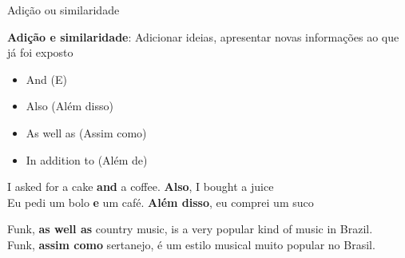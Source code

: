 \documentclass[compress,mathserif,xcolor=table]{beamer}
\begin{document}

\begin{frame}{Adição ou similaridade}

\textbf{Adição e similaridade}: Adicionar ideias, apresentar novas informações ao que já foi exposto

\vspace{0.25cm}

\begin{minipage}{.49\textwidth}
\begin{itemize}
    \item And (E)
    \item Also (Além disso)
\end{itemize}
\end{minipage}
\begin{minipage}{.49\textwidth}
\begin{itemize}
    \item As well as (Assim como)
    \item In addition to (Além de)
\end{itemize}
\end{minipage}

\vspace{0.5cm}

I asked for a cake \textbf{and} a coffee. \textbf{Also}, I bought a juice \\
\vspace{0.15cm}
Eu pedi um bolo \textbf{e} um café. \textbf{Além disso}, eu comprei um suco

\vspace{0.25cm}

Funk, \textbf{as well as} country music, is a very popular kind of music in Brazil. \\
\vspace{0.15cm}
Funk, \textbf{assim como} sertanejo, é um estilo musical muito popular no Brasil.
\end{frame}

\end{document}
